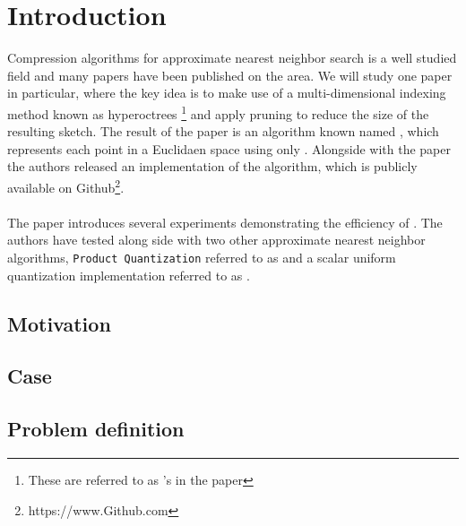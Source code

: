 \section{Introduction}
\label{introduction}
Compression algorithms for approximate nearest neighbor search is a well studied field and many papers have been published on the area. We will study one paper in particular, where the key idea is to make use of a multi-dimensional indexing method known as hyperoctrees \footnote{These are referred to as \qt{}'s in the paper} and apply pruning to reduce the size of the resulting sketch. The result of the paper is an algorithm known named \qs{}, which represents each point in a Euclidaen space using only . Alongside with the paper the authors released an implementation of the algorithm, which is publicly available on Github\footnote{https://www.Github.com}.
\\
\\
The paper introduces several experiments demonstrating the efficiency of \qs{}. The authors have tested \qs{} along side with two other approximate nearest neighbor algorithms, \texttt{Product Quantization} referred to as \pq{} and a scalar uniform quantization implementation referred to as \gr{}. 
\subsection{Motivation} %

\subsection{Case} %

\subsection{Problem definition} %

